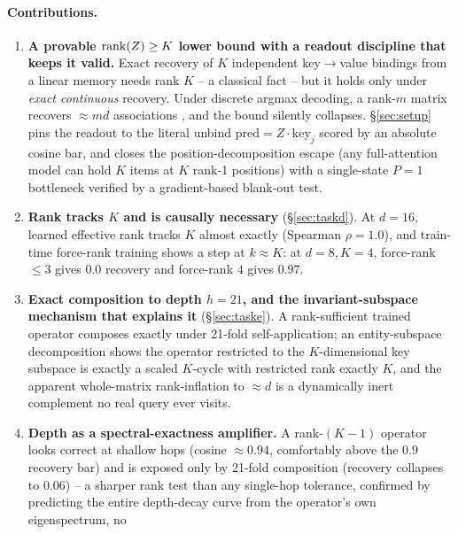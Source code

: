 \paragraph{Contributions.}
\begin{enumerate}
\setlength\itemsep{2pt}
\item \textbf{A provable $\operatorname{rank}(Z)\geq K$ lower bound with a readout
      discipline that keeps it valid.} Exact recovery of $K$ independent
      key$\to$value bindings from a linear memory needs rank $K$ -- a
      classical fact \citep{kohonen1972correlation,anderson1972simple} --
      but it holds only under \emph{exact continuous} recovery. Under
      discrete argmax decoding, a rank-$m$ matrix recovers $\approx md$
      associations \citep{nichani2025factual}, and the bound silently
      collapses. \S\ref{sec:setup} pins the readout to the literal unbind
      $\mathrm{pred}=Z\!\cdot\!\mathrm{key}_j$ scored by an absolute cosine
      bar, and closes the position-decomposition escape (any full-attention
      model can hold $K$ items at $K$ rank-1 positions) with a single-state
      $P{=}1$ bottleneck verified by a gradient-based blank-out test.
\item \textbf{Rank tracks $K$ and is causally necessary}
      (\S\ref{sec:taskd}). At $d=16$, learned effective rank tracks $K$
      almost exactly (Spearman $\rho=1.0$), and train-time force-rank
      training shows a step at $k\approx K$: at $d=8,K=4$, force-rank
      $\leq 3$ gives $0.0$ recovery and force-rank $4$ gives $0.97$.
\item \textbf{Exact composition to depth $h=21$, and the invariant-subspace
      mechanism that explains it} (\S\ref{sec:taske}). A rank-sufficient
      trained operator composes exactly under 21-fold self-application; an
      entity-subspace decomposition shows the operator restricted to the
      $K$-dimensional key subspace is exactly a scaled $K$-cycle with
      restricted rank exactly $K$, and the apparent whole-matrix
      rank-inflation to $\approx d$ is a dynamically inert complement no
      real query ever visits.
\item \textbf{Depth as a spectral-exactness amplifier.} A rank-$(K{-}1)$
      operator looks correct at shallow hops (cosine $\approx 0.94$,
      comfortably above the $0.9$ recovery bar) and is exposed only by
      21-fold composition (recovery collapses to $0.06$) -- a sharper rank
      test than any single-hop tolerance, confirmed by predicting the
      entire depth-decay curve from the operator's own eigenspectrum, no

\end{enumerate}
